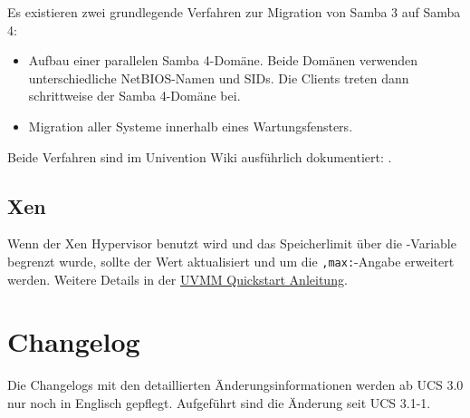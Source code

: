 Es existieren zwei grundlegende Verfahren zur Migration von Samba 3 auf Samba
4:

\begin{itemize}
\item Aufbau einer parallelen Samba 4-Domäne. Beide Domänen verwenden
unterschiedliche NetBIOS-Namen und SIDs. Die Clients treten dann schrittweise
der Samba 4-Domäne bei.
\item Migration aller Systeme innerhalb eines Wartungsfensters.
\end{itemize}

Beide Verfahren sind im Univention Wiki ausführlich dokumentiert:
.

\section{Xen} %
Wenn der Xen Hypervisor benutzt wird und das Speicherlimit über die \ucsUCR{}-Variable  begrenzt wurde, sollte der Wert aktualisiert und um die \texttt{,max:}-Angabe erweitert werden.
Weitere Details in der \href{http://wiki.univention.de/index.php?title=UVMM_Quickstart-3.1#Konfiguration_der_Dom0}{UVMM Quickstart Anleitung}.

\chapter{Changelog}

Die Changelogs mit den detaillierten Änderungsinformationen werden ab UCS 3.0
nur noch in Englisch gepflegt. Aufgeführt sind die Änderung seit UCS 3.1-1.






